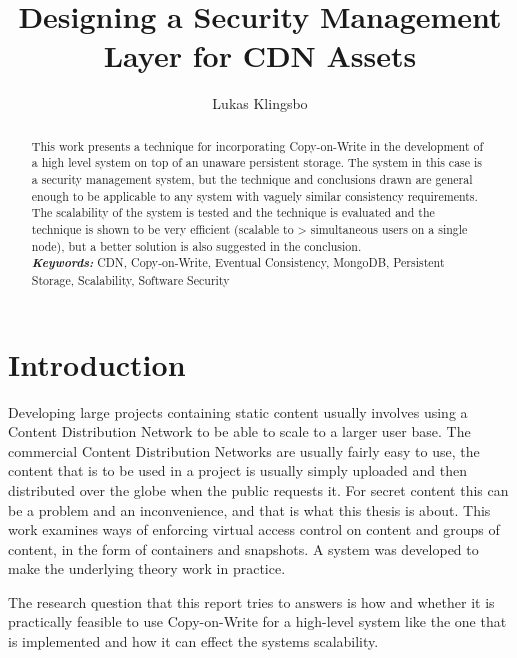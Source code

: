\documentclass[a4paper,12pt]{article}
\title{\textbf{Designing a Security Management Layer for CDN Assets}}
\author{Lukas Klingsbo}
\providecommand{\keywords}[1]{\textbf{\textit{Keywords: }} #1}
\begin{document}
\maketitle
%

\setcounter{page}{1}

%

\begin{abstract}
This work presents a technique for incorporating Copy-on-Write in the development of a high level
system on top of an unaware persistent storage. The system in this case is a security management
system, but the technique and conclusions drawn are general enough to be applicable to any system
with vaguely similar consistency requirements. The scalability of the system is tested and the
technique is evaluated and the technique is shown to be very efficient (scalable to >
simultaneous users on a single node), but a better solution is also suggested in the
conclusion.\\

\keywords{CDN, Copy-on-Write, Eventual Consistency, MongoDB, Persistent Storage, Scalability, 
Software Security}
\end{abstract}

\newpage\null\thispagestyle{empty}\newpage

\setcounter{tocdepth}{3}
\tableofcontents

\clearpage
{}
\setcounter{page}{1}

\section{Introduction}
Developing large projects containing static content usually involves using a Content Distribution
Network to be able to scale to a larger user base. The commercial Content Distribution Networks are
usually fairly easy to use, the content that is to be used in a project is usually simply uploaded
and then distributed over the globe when the public requests it. For secret content this can be a
problem and an inconvenience, and that is what this thesis is about. This work examines ways of
enforcing virtual access control on content and groups of content, in the form of containers and
snapshots. A system was developed to make the underlying theory work in practice. 

The research question that this report tries to answers is how and whether it is practically 
feasible to use Copy-on-Write for a high-level system like the one that is implemented and how 
it can effect the systems scalability. 
\end{document}
